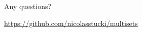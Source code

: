 \documentclass{beamer}
\begin{document}
\section{} 

\begin{frame}
 \vspace{3cm}
\Huge{\centerline{Any questions?}} \vspace{2cm}
\centerline{\small{\url{https://github.com/nicolasstucki/multisets}}}
\end{frame}

\end{document}
